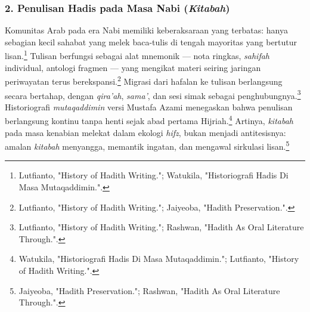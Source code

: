 \subsubsection*{2. Penulisan Hadis pada Masa Nabi (\textit{Kitabah})}

Komunitas Arab pada era Nabi memiliki keberaksaraan yang terbatas: hanya sebagian kecil sahabat yang melek baca-tulis di tengah mayoritas yang bertutur lisan.\footnote{Lutfianto, "History of Hadith Writing."; Watukila, "Historiografi Hadis Di Masa Mutaqaddimin.".} Tulisan berfungsi sebagai alat mnemonik --- nota ringkas, \textit{sahifah} individual, antologi fragmen --- yang mengikat materi seiring jaringan periwayatan terus berekspansi.\footnote{Lutfianto, "History of Hadith Writing."; Jaiyeoba, "Hadith Preservation.".} Migrasi dari hafalan ke tulisan berlangsung secara bertahap, dengan \textit{qira'ah}, \textit{sama'}, dan sesi simak sebagai penghubungnya.\footnote{Lutfianto, "History of Hadith Writing."; Rashwan, "Hadith As Oral Literature Through.".} Historiografi \textit{mutaqaddimin} versi Mustafa Azami menegaskan bahwa penulisan berlangsung kontinu tanpa henti sejak abad pertama Hijriah.\footnote{Watukila, "Historiografi Hadis Di Masa Mutaqaddimin."; Lutfianto, "History of Hadith Writing.".} Artinya, \textit{kitabah} pada masa kenabian melekat dalam ekologi \textit{hifz}, bukan menjadi antitesisnya: amalan \textit{kitabah} menyangga, memantik ingatan, dan mengawal sirkulasi lisan.\footnote{Jaiyeoba, "Hadith Preservation."; Rashwan, "Hadith As Oral Literature Through.".}

